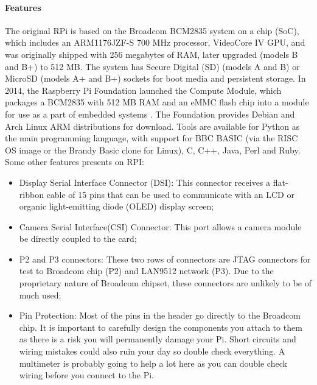\documentclass{acm_proc_article-sp}
\begin{document}
\paragraph{Features}
The original RPi is based on the Broadcom BCM2835 system on a chip (SoC)\cite{Broadcom}, which includes an ARM1176JZF-S 700 MHz processor, VideoCore IV GPU\cite{Brose}, and was originally shipped with 256 megabytes of RAM, later upgraded (models B and B+) to 512 MB\cite{raspOrg}. The system has Secure Digital (SD) (models A and B) or MicroSD (models A+ and B+) sockets for boot media and persistent storage\cite{Elinux}.
\newline
\newline
In 2014, the Raspberry Pi Foundation launched the Compute Module, which packages a BCM2835 with 512 MB RAM and an eMMC flash chip into a module for use as a part of embedded systems \cite{raspNewProduct}.
The Foundation provides Debian and Arch Linux ARM distributions for download. Tools are available for Python as the main programming language, with support for BBC BASIC (via the RISC OS image or the Brandy Basic clone for Linux)\cite{Jaguar}, C, C++, Java, Perl and Ruby.
\newline
\newline
Some other features presents on RPI:
\begin{itemize}
\item Display Serial Interface Connector (DSI): This connector receives a flat-ribbon cable of 15 pins that can be used to communicate with an LCD or organic light-emitting diode (OLED) display screen;	
\item Camera Serial Interface(CSI) Connector: This port allows a camera module be directly coupled to the card;
\item P2 and P3 connectors: These two rows of connectors are JTAG connectors for test to Broadcom chip (P2) and LAN9512 network (P3). Due to the proprietary nature of Broadcom chipset, these connectors are unlikely to be of much used;
\item Pin Protection: Most of the pins in the header go directly to the Broadcom chip. It is important to carefully design the components you attach to them as there is a risk you will permanently damage your Pi. Short circuits and wiring mistakes could also ruin your day so double check everything. A multimeter is probably going to help a lot here as you can double check wiring before you connect to the Pi.
\end{itemize}
\end{document}
